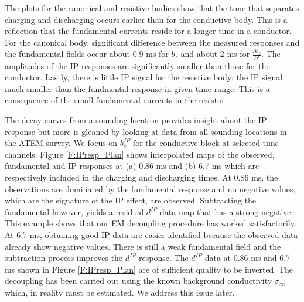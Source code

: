 \documentclass[extra,mreferee]{gji}
\newcommand{\siginf}{\sigma_\infty}
\newcommand{\dip}{d^{IP}}
\begin{document}
The plots for the canonical and resistive bodies show that the time that separates charging and discharging occurs earlier than for the conductive body. This is a reflection that the fundamental currents reside for a longer time in a conductor. For the canonical body, significant difference between the measured responses and the fundamental fields occur about 0.9 ms for $b_z$ and about 2 ms for $\frac{\partial b_z}{\partial t}$. The amplitudes of the IP responses are significantly smaller than those for the conductor.  Lastly, there is little IP signal for the resistive body; the IP signal much smaller than the fundmental response in given time range. This is a consequence of the small fundamental currents in the resistor. 

The decay curves from a sounding location  provides insight about the IP response but more is gleaned by looking at data from all  sounding locations in the ATEM survey. We focus on $b_z^{IP}$ for the conductive block at selected time channels. Figure \ref{F:IPresp_Plan} shows interpolated maps of the observed, fundamental and IP responses at (a) 0.86 ms and (b) 6.7 ms which are respectively included in the charging and discharging times. 
At 0.86 ms, the observations are dominated by the fundamental response and no negative values,  which are the signature of the IP effect, are observed. Subtracting the fundamental however, yields a residual $\dip$ data map that has a strong negative. This  example  shows that our EM decoupling procedure has worked satisfactorily.  At 6.7 ms, obtaining good IP data are easier identified because the observed data already show negative values. There is still a weak fundamental field and the subtraction process improves the $\dip$ response. The $\dip$ data at  0.86 ms and 6.7 ms shown in Figure \ref{F:IPresp_Plan} are of sufficient quality to be inverted. The decoupling has been carried out using the known background conductivity $\siginf$ which, in reality must be estimated. We address this issue later. 
\end{document}
